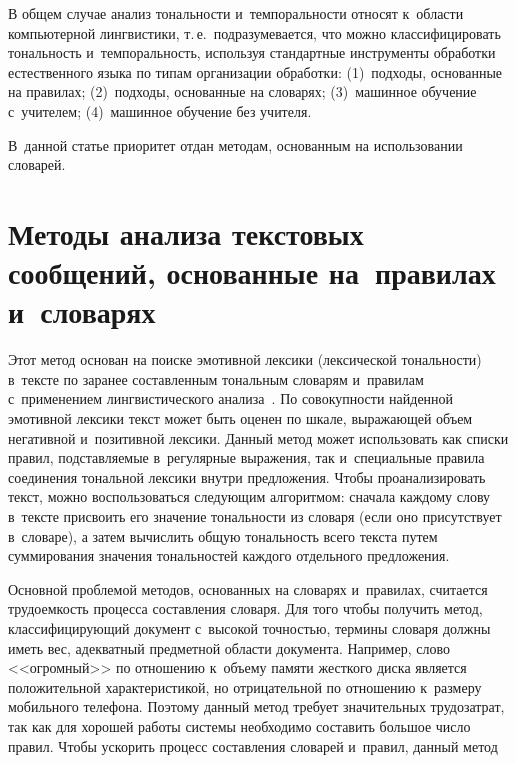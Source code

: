 \begin{multicols}{2}
  В общем случае анализ тональности и~темпоральности относят к~области 
компьютерной лингви\-стики, т.\,е.\ подразумевается, что можно 
классифицировать тональность и~темпоральность, используя стандартные 
инструменты обработки естественного языка по типам организации обработки: 
(1)~подходы, основанные на правилах; (2)~подходы, основанные на словарях; 
(3)~машинное обучение с~учителем; (4)~машинное обучение без учителя. 

В~данной статье приоритет отдан методам, основанным на использовании 
словарей.
  
\section{Методы анализа текстовых сообщений, основанные 
на~правилах и~словарях}

  Этот метод основан на поиске эмотивной лексики (лексической тональности) 
в~тексте по заранее составленным тональным словарям и~правилам 
с~применением лингвистического анализа~\cite{11-sig}. По совокупности 
найденной эмотивной лексики текст может быть оценен по шкале, 
выражающей объем негативной и~позитивной лексики. Данный метод может 
использовать как списки правил, под\-став\-ля\-емые в~регулярные выражения, так 
и~специальные правила соединения тональной лексики внутри предложения. 
Чтобы проанализировать текст, можно воспользоваться следующим 
алгоритмом: сначала каждому слову в~тексте присвоить его значение 
тональности из словаря (если оно присутствует в~словаре), а затем вычислить 
общую тональность всего текста путем суммирования значения тональностей 
каждого отдельного предложения.


  
  Основной проблемой методов, основанных на словарях и~правилах, 
считается трудоемкость процесса составления словаря. Для того чтобы 
получить метод, классифицирующий документ с~высокой точностью, термины 
словаря должны иметь вес, адекватный предметной области документа. 
Например, слово <<огромный>> по отношению к~объему памяти жесткого 
диска является положительной характеристикой, но отрицательной по 
отношению к~размеру мобильного телефона. Поэтому данный метод требует 
значительных трудозатрат, так как для хорошей работы системы необходимо 
составить большое число правил. Чтобы ускорить процесс составления 
словарей и~правил, данный метод\linebreak\vspace*{-12pt}

\pagebreak

\end{multicols}

